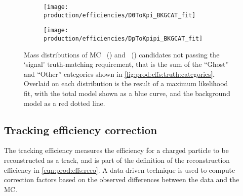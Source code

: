 \begin{figure}
  \begin{subfigure}[b]{0.5\textwidth}
    \centering
    \texttt{[image: production/efficiencies/D0ToKpi\_BKGCAT\_fit]}
    \caption{\DzToKpi}
    \label{fig:prod:effs:truth:fit:D0ToKpi}
  \end{subfigure}
  \begin{subfigure}[b]{0.5\textwidth}
    \centering
    \texttt{[image: production/efficiencies/DpToKpipi\_BKGCAT\_fit]}
    \caption{\DpToKpipi}
    \label{fig:prod:effs:truth:fit:DpToKpipi}
  \end{subfigure}
  \caption{%
    Mass distributions of \ac{MC}
    \PDzero~() and
    \PDplus~() candidates not
    passing the `signal' truth-matching requirement, that is the sum of the
    ``Ghost'' and ``Other'' categories shown in
    \cref{fig:prod:effs:truth:categories}.
    Overlaid on each distribution is the result of a maximum likelihood fit,
    with the total model shown as a blue curve, and the background model as a
    red dotted line.
  }
  \label{fig:prod:effs:truth:fit}
\end{figure}

\subsection{Tracking efficiency correction}
\label{chap:prod:effs:tracking}

The tracking efficiency measures the efficiency for a charged particle to be
reconstructed as a track, and is part of the definition of the reconstruction
efficiency in \cref{eqn:prod:effs:reco}.
A data-driven technique is used to compute correction factors based on the
observed differences between the data and the \ac{MC}.

